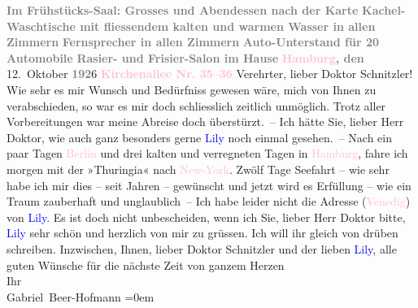            \centering{}\textcolor{gray}{\textbf{Im Frühstücks-Saal: Grosses und Abendessen nach der
                            Karte}}\pend
           \pstart
           \noindent{}\centering{}\textcolor{gray}{\textbf{Kachel-Waschtische mit fliessendem kalten und warmen
                            Wasser in allen Zimmern}}\pend
           \pstart
           \noindent{}\textcolor{gray}{\textbf{Fernsprecher in allen Zimmern}}\pend
           \pstart
           \textcolor{gray}{\textbf{Auto-Unterstand für 20 Automobile}}\pend
           \pstart
           \textcolor{gray}{\textbf{Rasier- und Frisier-Salon im Hause}}\pend
           \pstart
           \raggedleft{}\textcolor{gray}{\textbf{\textcolor{pink}{Hamburg}{}\ledrightnote{\textcolor{pink}{Hamburg}}, den}}{ }12. Oktober \textcolor{gray}{\textbf{192}}6\pend
           \pstart
           \raggedleft{}\textcolor{gray}{\textbf{\textcolor{pink}{Kirchenallee Nr. 35–36}{}\ledrightnote{\textcolor{pink}{Kirchenallee}}}}\pend
           \pstart{}Verehrter, lieber Doktor Schnitzler!\pend\pstart
           Wie sehr es mir Wunsch und Bedürfniss gewesen wäre, mich von Ihnen zu
                    verabschieden, so war es mir doch schliesslich zeitlich unmöglich. Trotz aller
                    Vorbereitungen war meine Abreise doch überstürzt. –\pend
           \pstart
           Ich hätte Sie, lieber Herr Doktor, wie auch ganz besonders gerne \textcolor{blue}{Lily}{}\ledrightnote{\textcolor{blue}{Lili Schnitzler}} noch einmal gesehen. –\pend
           \pstart
           Nach ein paar Tagen \textcolor{pink}{Berlin}{}\ledrightnote{\textcolor{pink}{Berlin}} und drei kalten und
                    verregneten Tagen in \textcolor{pink}{Hamburg}{}\ledrightnote{\textcolor{pink}{Hamburg}}, fahre ich morgen
                    mit der »Thuringia« nach \textcolor{pink}{New-York}{}\ledrightnote{\textcolor{pink}{New York City}}.\pend
           \pstart
           Zwölf Tage Seefahrt – wie sehr habe ich mir dies – seit Jahren – gewünscht und
                    jetzt wird es Erfüllung – wie ein Traum zauberhaft und unglaublich –\pend
           \pstart
           Ich habe leider nicht die Adresse (\textcolor{pink}{Venedig}{}\ledrightnote{\textcolor{pink}{Venedig}}) von
                        \textcolor{blue}{Lily}{}\ledrightnote{\textcolor{blue}{Lili Schnitzler}}.\pend
           \pstart
           Es ist doch nicht unbescheiden, wenn ich Sie, lieber Herr Doktor {\pb}bitte, \textcolor{blue}{Lily}{}\ledrightnote{\textcolor{blue}{Lili Schnitzler}} sehr schön und herzlich von mir zu grüssen. Ich will
                    ihr gleich von drüben schreiben.\pend
           \pstart
           Inzwischen, Ihnen, lieber Doktor Schnitzler und der lieben \textcolor{blue}{Lily}{}\ledrightnote{\textcolor{blue}{Lili Schnitzler}}, alle guten Wünsche für die nächste Zeit\pend
           \pstart
           von ganzem Herzen{\\[\baselineskip]}Ihr{\\[\baselineskip]}\spacefill\mbox{Gabriel Beer-Hofmann}\pend
           \leftskip=0em{}\endnumbering{}  
      